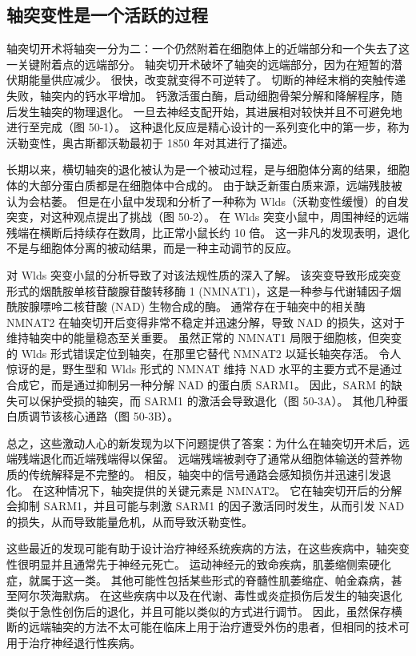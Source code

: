\subsection{轴突变性是一个活跃的过程}
轴突切开术将轴突一分为二：一个仍然附着在细胞体上的近端部分和一个失去了这一关键附着点的远端部分。 轴突切开术破坏了轴突的远端部分，因为在短暂的潜伏期能量供应减少。 很快，改变就变得不可逆转了。 切断的神经末梢的突触传递失败，轴突内的钙水平增加。 钙激活蛋白酶，启动细胞骨架分解和降解程序，随后发生轴突的物理退化。 一旦去神经支配开始，其进展相对较快并且不可避免地进行至完成（图 50-1）。 这种退化反应是精心设计的一系列变化中的第一步，称为沃勒变性，奥古斯都沃勒最初于 1850 年对其进行了描述。

长期以来，横切轴突的退化被认为是一个被动过程，是与细胞体分离的结果，细胞体的大部分蛋白质都是在细胞体中合成的。 由于缺乏新蛋白质来源，远端残肢被认为会枯萎。 但是在小鼠中发现和分析了一种称为 Wlds（沃勒变性缓慢）的自发突变，对这种观点提出了挑战（图 50-2）。 在 Wlds 突变小鼠中，周围神经的远端残端在横断后持续存在数周，比正常小鼠长约 10 倍。 这一非凡的发现表明，退化不是与细胞体分离的被动结果，而是一种主动调节的反应。

对 Wlds 突变小鼠的分析导致了对该法规性质的深入了解。 该突变导致形成突变形式的烟酰胺单核苷酸腺苷酸转移酶 1 (NMNAT1)，这是一种参与代谢辅因子烟酰胺腺嘌呤二核苷酸 (NAD) 生物合成的酶。 通常存在于轴突中的相关酶 NMNAT2 在轴突切开后变得非常不稳定并迅速分解，导致 NAD 的损失，这对于维持轴突中的能量稳态至关重要。 虽然正常的 NMNAT1 局限于细胞核，但突变的 Wlds 形式错误定位到轴突，在那里它替代 NMNAT2 以延长轴突存活。 令人惊讶的是，野生型和 Wlds 形式的 NMNAT 维持 NAD 水平的主要方式不是通过合成它，而是通过抑制另一种分解 NAD 的蛋白质 SARM1。 因此，SARM 的缺失可以保护受损的轴突，而 SARM1 的激活会导致退化（图 50-3A）。 其他几种蛋白质调节该核心通路（图 50-3B）。


总之，这些激动人心的新发现为以下问题提供了答案：为什么在轴突切开术后，远端残端退化而近端残端得以保留。 远端残端被剥夺了通常从细胞体输送的营养物质的传统解释是不完整的。 相反，轴突中的信号通路会感知损伤并迅速引发退化。 在这种情况下，轴突提供的关键元素是 NMNAT2。 它在轴突切开后的分解会抑制 SARM1，并且可能与刺激 SARM1 的因子激活同时发生，从而引发 NAD 的损失，从而导致能量危机，从而导致沃勒变性。

这些最近的发现可能有助于设计治疗神经系统疾病的方法，在这些疾病中，轴突变性很明显并且通常先于神经元死亡。 运动神经元的致命疾病，肌萎缩侧索硬化症，就属于这一类。 其他可能性包括某些形式的脊髓性肌萎缩症、帕金森病，甚至阿尔茨海默病。 在这些疾病中以及在代谢、毒性或炎症损伤后发生的轴突退化类似于急性创伤后的退化，并且可能以类似的方式进行调节。 因此，虽然保存横断的远端轴突的方法不太可能在临床上用于治疗遭受外伤的患者，但相同的技术可用于治疗神经退行性疾病。


